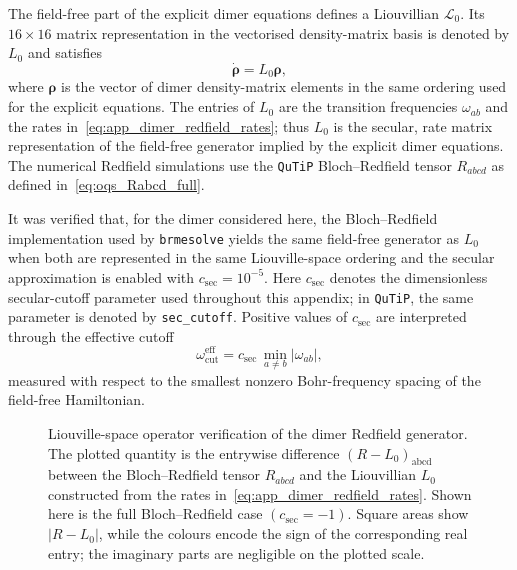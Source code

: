The field-free part of the explicit dimer equations defines a
Liouvillian \(\mathcal{L}_0\). Its \(16\times16\) matrix representation in the
vectorised density-matrix basis is denoted by \(L_0\) and satisfies
\begin{equation*}
\dot{\boldsymbol{\rho}}=L_0\boldsymbol{\rho},
\end{equation*}
where \(\boldsymbol{\rho}\) is the vector of dimer density-matrix elements in
the same ordering used for the explicit equations. The entries of \(L_0\) are
the transition frequencies \(\omega_{ab}\) and the rates
in~\autoref{eq:app_dimer_redfield_rates}; thus \(L_0\) is the secular,
rate matrix representation of the field-free generator implied by the
explicit dimer equations. The numerical
Redfield simulations use the
\texttt{QuTiP} Bloch--Redfield tensor \(R_{abcd}\) as defined in~\autoref{eq:oqs_Rabcd_full}.

It was verified that, for the dimer considered here, the
Bloch--Redfield implementation used by \texttt{brmesolve} yields the same
field-free generator as \(L_0\) when both are represented in the same
Liouville-space ordering and the secular approximation is enabled with
\(c_{\mathrm{sec}} = 10^{-5}\). Here \(c_{\mathrm{sec}}\) denotes the
dimensionless secular-cutoff parameter used throughout this appendix; in
\texttt{QuTiP}, the same parameter is denoted by
\texttt{sec\_cutoff}. Positive values of \(c_{\mathrm{sec}}\) are interpreted
through the effective cutoff
\begin{equation*}
    \omega_{\mathrm{cut}}^{\mathrm{eff}}
    =
    c_{\mathrm{sec}}\,\min_{a\neq b}\left|\omega_{ab}\right|,
\end{equation*}
measured with respect to the smallest nonzero Bohr-frequency spacing of the
field-free Hamiltonian.

\begin{figure}[htbp]
    \centering
    \caption{Liouville-space operator verification of the dimer Redfield generator. The
    plotted quantity is the entrywise difference \((R-L_0)_{\mathrm{abcd}}\) between the
    Bloch--Redfield tensor \(R_{abcd}\) and
    the Liouvillian \(L_0\) constructed from the rates
    in~\autoref{eq:app_dimer_redfield_rates}. Shown here is the full
    Bloch--Redfield case \((c_{\mathrm{sec}} = -1)\). Square areas show
    \(|R-L_0|\), while the colours encode the sign of the corresponding real entry; the
    imaginary parts are negligible on the plotted scale.}
    \label{fig:app_dimer_redfield_tensor_difference_focus}
\end{figure}

